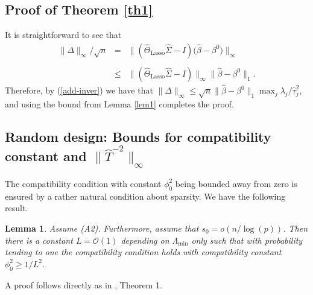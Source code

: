 \documentclass[aos,MSNbibl,dvips]{arximspdf}
\newtheorem{lemm}{Lemma}[section]
\begin{document}
\subsection{Proof of Theorem \protect\ref{th1}}\label{subsecproofth1}

It is straightforward to see that
%
\begin{eqnarray}
\label{prlabel1} \|\Delta\|_{\infty} /\sqrt n &=&\bigl \|(\hat{
\Theta}_{\mathrm{Lasso}} \hat {\Sigma} - I) \bigl(\hat{\beta} - \beta^0
\bigr)\bigr\|_{\infty}
\nonumber
\\[-8pt]
\\[-8pt]
\nonumber
&\le&\bigl\|(\hat{\Theta }_{\mathrm{Lasso}} \hat{\Sigma} - I)
\bigr\|_{\infty} \bigl\|\hat{\beta} - \beta^0\bigr\|_1.
\end{eqnarray}
%
Therefore, by (\ref{add-inver}) we have that
$\|\Delta\|_{\infty} \le\sqrt n \| \hat\beta- \beta^0 \|_1 \max_j
{\lambda_j}/{\hat{\tau}_j^2} $, and using the bound from
Lemma \ref{lem1} completes the proof. %


\subsection{Random design: Bounds for compatibility constant and
\texorpdfstring{$\|\hat T^{-2}\|_{\infty}$}{||T-2||infinity}}\label{subseccompbound}

The compatibility condition with constant $\phi_0^2$ being bounded away
from zero
is ensured by a rather natural condition about sparsity.
We have the following result.
%
\begin{lemm}\label{lem2}
Assume \textup{(A2)}. Furthermore, assume that
$s_0 = o(n/\log(p))$.
Then there is a constant $L= {\mathcal O} (1) $ depending on $\Lambda
_\mathrm{min}$ only such that with probability tending to one the compatibility
condition holds with compatibility constant $\phi_{0}^2 \ge1/L^2 $.
\end{lemm}
%
A proof follows directly as in \cite{raskutti2010restricted}, Theorem 1.
\end{document}
